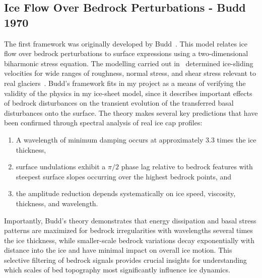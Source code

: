 \subsection{Ice Flow Over Bedrock Perturbations - Budd 1970}
The first framework was originally developed by Budd~\cite{Budd_1970}. This model relates ice flow over bedrock perturbations to surface expressions using a two-dimensional biharmonic stress equation. The modelling carried out in~\cite{Budd_1970} determined ice-sliding velocities for wide ranges of roughness, normal stress, and shear stress relevant to real glaciers~\cite{Budd_1970}. Budd's framework fits in my project as a means of verifying the validity of the physics in my ice-sheet model, since it describes important effects of bedrock disturbances on the transient evolution of the transferred basal disturbances onto the surface. The theory makes several key predictions that have been confirmed through spectral analysis of real ice cap profiles: 
\begin{enumerate}
    \item A wavelength of minimum damping occurs at approximately 3.3 times the ice thickness, 
    \item surface undulations exhibit a $\pi/2$ phase lag relative to bedrock features with steepest surface slopes occurring over the highest bedrock points, and 
    \item the amplitude reduction depends systematically on ice speed, viscosity, thickness, and wavelength. 
\end{enumerate}

Importantly, Budd's theory demonstrates that energy dissipation and basal stress patterns are maximized for bedrock irregularities with wavelengths several times the ice thickness, while smaller-scale bedrock variations decay exponentially with distance into the ice and have minimal impact on overall ice motion. This selective filtering of bedrock signals provides crucial insights for understanding which scales of bed topography most significantly influence ice dynamics.

